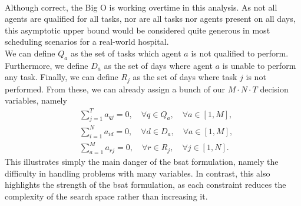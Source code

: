 \\
Although correct, the Big O is working overtime in this analysis. As not all agents are qualified for all tasks, nor are all tasks nor agents present on all days, this asymptotic upper bound would be considered quite generous in most scheduling scenarios for a real-world hospital. 
\\
We can define \(Q_a\) as the set of tasks which agent \(a\) is not qualified to perform. Furthermore, we define \(D_a\) as the set of days where agent \(a\) is unable to perform any task. Finally, we can define \(R_j\) as the set of days where task \(j\) is not performed. From these, we can already assign a bunch of our \(M \cdot N \cdot T\) decision variables, namely
\begin{align*}
    &\sum_{j = 1}^T a_{qj} = 0, \quad \forall q \in Q_a, \quad \forall a \in [1, M],
    \\
    &\sum_{i = 1}^N a_{id} = 0, \quad \forall d \in D_a, \quad \forall a \in [1, M],
    \\
    &\sum_{a = 1}^M a_{rj} = 0, \quad \forall r \in R_j, \quad \forall j \in [1, N].
\end{align*}
This illustrates simply the main danger of the \acrshort{bsat} formulation, namely the difficulty in handling problems with many variables. In contrast, this also highlights the strength of the \acrshort{bsat} formulation, as each constraint reduces the complexity of the search space rather than increasing it.